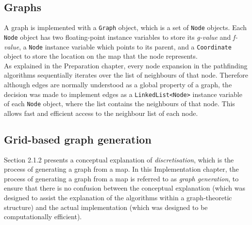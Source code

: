\documentclass[12pt,notitlepage]{report}
\begin{document}
\subsection{Graphs}
A graph is implemented with a {\tt Graph} object, which is a set of {\tt Node} objects. Each {\tt Node} object has two floating-point instance variables to store its {\em g-value} and {\em f-value}, a {\tt Node} instance variable which points to its parent, and a {\tt Coordinate} object to store the location on the map that the node represents.\\

\noindent
As explained in the Preparation chapter, every node expansion in the pathfinding algorithms sequentially iterates over the list of neighbours of that node. Therefore although edges are normally understood as a global property of a graph, the decision was made to implement edges as a {\tt LinkedList<Node>} instance variable of each {\tt Node} object, where the list contains the neighbours of that node. This allows fast and efficient access to the neighbour list of each node.\\

\subsection{Grid-based graph generation}
Section 2.1.2 presents a conceptual explanation of {\em discretisation}, which is the process of generating a graph from a map. In this Implementation chapter, the process of generating a graph from a map is referred to as {\em graph generation}, to ensure that there is no confusion between the conceptual explanation (which was designed to assist the explanation of the algorithms within a graph-theoretic structure) and the actual implementation (which was designed to be computationally efficient). \\
\end{document}
